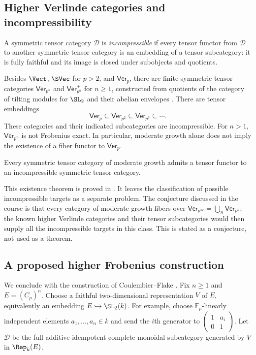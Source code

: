 \subsection{Higher Verlinde categories and incompressibility}
\begin{definition}
A symmetric tensor category $\mathcal D$ is \emph{incompressible} if
every tensor functor from $\mathcal D$ to another symmetric tensor
category is an embedding of a tensor subcategory: it is fully faithful
and its image is closed under subobjects and quotients.
\end{definition}
Besides $\Vect$, $\SVec$ for $p>2$, and $\mathsf{Ver}_p$, there are
finite symmetric tensor categories $\mathsf{Ver}_{p^n}$ and
$\mathsf{Ver}_{p^n}^+$ for $n\geq1$, constructed from quotients of the
category of tilting modules for $\SL_2$ and their abelian envelopes
\cite{BEOHigher}. There are tensor embeddings
\[
 \mathsf{Ver}_p\subseteq\mathsf{Ver}_{p^2}
 \subseteq\mathsf{Ver}_{p^3}\subseteq\cdots.
\]
These categories and their indicated subcategories are incompressible.
For $n>1$, $\mathsf{Ver}_{p^n}$ is not Frobenius exact. In particular,
moderate growth alone does not imply the existence of a fiber functor
to $\mathsf{Ver}_p$.

\begin{theorem}
Every symmetric tensor category of moderate growth admits a tensor
functor to an incompressible symmetric tensor category.
\end{theorem}
This existence theorem is proved in \cite{CEOIncompressible}. It leaves
the classification of possible incompressible targets as a separate
problem. The conjecture discussed in the course is that every category
of moderate growth fibers over
$\mathsf{Ver}_{p^\infty}=\bigcup_n\mathsf{Ver}_{p^n}$; the known higher
Verlinde categories and their tensor subcategories would then supply
all the incompressible targets in this class. This is stated as a
conjecture, not used as a theorem.

\subsection{A proposed higher Frobenius construction}
We conclude with the construction of Coulembier--Flake
\cite{CFHigher}. Fix $n\geq1$ and $E=(C_p)^n$. Choose a faithful
two-dimensional representation $V$ of $E$, equivalently an embedding
$E\hookrightarrow\SL_2(k)$. For example, choose
$\mathbb F_p$-linearly independent elements $a_1,\ldots,a_n\in k$ and
send the $i$th generator to
$\left(\begin{smallmatrix}1&a_i\\0&1\end{smallmatrix}\right)$.
Let $\mathcal D$ be the full additive idempotent-complete monoidal
subcategory generated by $V$ in $\Rep_k(E)$.

